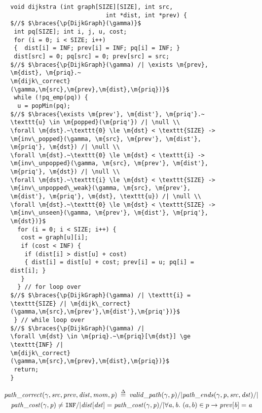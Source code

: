 
\begin{figure}
\begin{lstlisting}[mathescape=true,showlines=true]
void dijkstra (int graph[SIZE][SIZE], int src, 
                           int *dist, int *prev) {
$//$ $\braces{\p{DijkGraph}(\gamma)}$
 int pq[SIZE]; int i, j, u, cost;
 for (i = 0; i < SIZE; i++) 
 {  dist[i] = INF; prev[i] = INF; pq[i] = INF; }
 dist[src] = 0; pq[src] = 0; prev[src] = src;
$//$ $\braces{\p{DijkGraph}(\gamma) /| \exists \m{prev}, \m{dist}, \m{priq}.~
\m{dijk\_correct}(\gamma,\m{src},\m{prev},\m{dist},\m{priq})}$
 while (!pq_emp(pq)) {
  u = popMin(pq);
$//$ $\braces{\exists \m{prev'}, \m{dist'}, \m{priq'}.~ \texttt{u} \in \m{popped}(\m{priq'}) /| \null \\
\forall \m{dst}.~\texttt{0} \le \m{dst} < \texttt{SIZE} -> \m{inv\_popped}(\gamma, \m{src}, \m{prev'}, \m{dist'}, \m{priq'}, \m{dst}) /| \null \\
\forall \m{dst}.~\texttt{0} \le \m{dst} < \texttt{i} -> \m{inv\_unpopped}(\gamma, \m{src}, \m{prev'}, \m{dist'}, \m{priq'}, \m{dst}) /| \null \\
\forall \m{dst}.~\texttt{i} \le \m{dst} < \texttt{SIZE} -> \m{inv\_unpopped\_weak}(\gamma, \m{src}, \m{prev'}, \m{dist'}, \m{priq'}, \m{dst}, \texttt{u}) /| \null \\
\forall \m{dst}.~\texttt{0} \le \m{dst} < \texttt{SIZE} -> \m{inv\_unseen}(\gamma, \m{prev'}, \m{dist'}, \m{priq'}, \m{dst})}$
  for (i = 0; i < SIZE; i++) {
   cost = graph[u][i]; 
   if (cost < INF) {
    if (dist[i] > dist[u] + cost)
    { dist[i] = dist[u] + cost; prev[i] = u; pq[i] = dist[i]; }
   }  
  } // for loop over
$//$ $\braces{\p{DijkGraph}(\gamma) /| \texttt{i} = \texttt{SIZE} /| \m{dijk\_correct}(\gamma,\m{src},\m{prev'},\m{dist'},\m{priq'})}$
 } // while loop over
$//$ $\braces{\p{DijkGraph}(\gamma) /|
\forall \m{dst} \in \m{priq}.~\m{priq}[\m{dst}] \ge \texttt{INF} /| 
\m{dijk\_correct}(\gamma,\m{src},\m{prev},\m{dist},\m{priq})}$
 return;
}
\end{lstlisting}
\vspace{-1em}
\begin{equation*}
\begin{split}
&\!\!\!\!\!\!\m{path\_correct}(\gamma, \m{src}, \m{prev}, \m{dist}, \m{mom}, \m{p}) \; \defeq \; 
\m{valid\_path}(\gamma, \m{p}) /| \m{path\_ends}(\gamma, \m{p}, \m{src}, \m{dst}) /| \null \\
&\m{path\_cost}(\gamma, \m{p}) \not= \texttt{INF} /| \m{dist}[\m{dst}] = \m{path\_cost}(\gamma, \m{p}) /| \forall \m{a, b}.~\m(a,b) \in p -> \m{prev}[\m{b}] = \m{a} \\

\end{split}
\end{equation*}
\end{figure}
